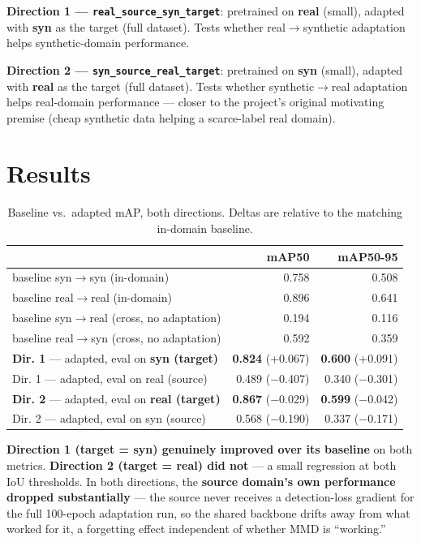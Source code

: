 \documentclass[11pt]{article}
\begin{document}
\textbf{Direction 1 --- \texttt{real\_source\_syn\_target}}: pretrained on \textbf{real} (small),
adapted with \textbf{syn} as the target (full dataset). Tests whether real$\to$synthetic
adaptation helps synthetic-domain performance.

\textbf{Direction 2 --- \texttt{syn\_source\_real\_target}}: pretrained on \textbf{syn} (small),
adapted with \textbf{real} as the target (full dataset). Tests whether synthetic$\to$real
adaptation helps real-domain performance --- closer to the project's original motivating premise
(cheap synthetic data helping a scarce-label real domain).

\section{Results}

\begin{table}[h!]
    \centering
    \begin{tabular}{lrr}
        \toprule
         & mAP50 & mAP50-95 \\
        \midrule
        baseline syn$\to$syn (in-domain) & 0.758 & 0.508 \\
        baseline real$\to$real (in-domain) & 0.896 & 0.641 \\
        baseline syn$\to$real (cross, no adaptation) & 0.194 & 0.116 \\
        baseline real$\to$syn (cross, no adaptation) & 0.592 & 0.359 \\
        \midrule
        \textbf{Dir. 1} --- adapted, eval on \textbf{syn (target)} & \textbf{0.824} (+0.067) & \textbf{0.600} (+0.091) \\
        Dir. 1 --- adapted, eval on real (source) & 0.489 ($-$0.407) & 0.340 ($-$0.301) \\
        \midrule
        \textbf{Dir. 2} --- adapted, eval on \textbf{real (target)} & \textbf{0.867} ($-$0.029) & \textbf{0.599} ($-$0.042) \\
        Dir. 2 --- adapted, eval on syn (source) & 0.568 ($-$0.190) & 0.337 ($-$0.171) \\
        \bottomrule
    \end{tabular}
    \caption{Baseline vs.\ adapted mAP, both directions. Deltas are relative to the matching
    in-domain baseline.}
\end{table}

\textbf{Direction 1 (target = syn) genuinely improved over its baseline} on both metrics.
\textbf{Direction 2 (target = real) did not} --- a small regression at both IoU thresholds. In
both directions, the \textbf{source domain's own performance dropped substantially} ---
the source never receives a detection-loss gradient for the full 100-epoch adaptation run, so the
shared backbone drifts away from what worked for it, a forgetting effect independent of whether
MMD is ``working.''
\end{document}
